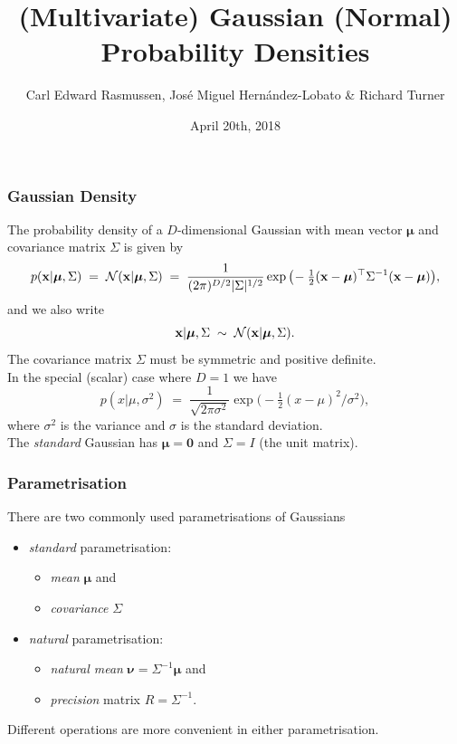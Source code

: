 

\title[Gaussian Densities]{(Multivariate) Gaussian (Normal)\\ Probability Densities}
\author[Rasmussen, Hern\`andez-Lobato \& Turner]{Carl Edward
  Rasmussen,  Jos\'e Miguel Hern\'andez-Lobato \& Richard Turner}
\date{April 20th, 2018}



\begin{frame}
\titlepage
\end{frame}

\begin{frame}
\frametitle{Gaussian Density}

The probability density of a $D$-dimensional Gaussian with mean vector
$\boldsymbol{\mu}$ and covariance matrix $\Sigma$ is given by
%
\[
p({\bf x}|\boldsymbol{\mu},\Sigma)\;=\;
{\cal N}({\bf x}|\boldsymbol{\mu},\Sigma)\;=\;\frac{1}{(2\pi)^{D/2}|\Sigma|^{1/2}}
\exp\big(\!-\tfrac{1}{2}({\bf x}-\boldsymbol{\mu})^\top \Sigma^{-1}
({\bf x}-\boldsymbol{\mu})\big),
\]
%
and we also write
%
\[
{\bf x}|\boldsymbol{\mu},\Sigma\;\sim\;{\cal N}({\bf x}|\boldsymbol{\mu},\Sigma).
\]
%
The covariance matrix $\Sigma$ must be symmetric and positive definite.\\[1ex]

In the special (scalar) case where $D=1$ we have
%
\[
p(x|\mu,\sigma^2)\;=\;\frac{1}{\sqrt{2\pi\sigma^2}}
\exp\big(\!-\tfrac{1}{2}(x-\mu)^2/\sigma^2\big),
\]
%
where $\sigma^2$ is the variance and $\sigma$ is the standard deviation.\\[1ex]

The \emph{standard} Gaussian has $\boldsymbol{\mu}=\boldsymbol{0}$ and
$\Sigma=I$ (the unit matrix).
\end{frame}

\begin{frame}
\frametitle{Parametrisation}

There are two commonly used parametrisations of Gaussians
\begin{itemize}
\item \emph{standard} parametrisation:
\begin{itemize}
\item \emph{mean} $\boldsymbol{\mu}$ and
\item \emph{covariance} $\Sigma$
\end{itemize}
\item \emph{natural} parametrisation:
\begin{itemize}
\item \emph{natural mean}
  $\boldsymbol{\nu}=\Sigma^{-1}\boldsymbol{\mu}$ and
\item \emph{precision} matrix $R=\Sigma^{-1}$.
\end{itemize}
\end{itemize}
Different operations are more convenient in either parametrisation.

\end{frame}

